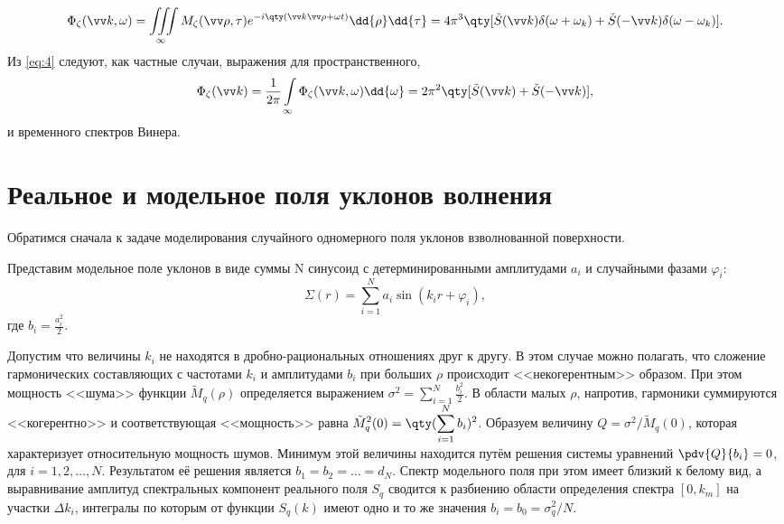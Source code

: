 \begin{gather}
	\label{eq:4}
	\Phi_{\zeta}(\vec k ,\omega)= \iiint\limits_{\infty} 
	M_{\zeta}(\vec \rho, \tau) e^{-i\qty(\vec k \vec \rho + \omega t)} \dd{\rho} \dd{\tau}=4\pi^3 \qty[\tilde S(\vec k) \delta(\omega+\omega_k)+\tilde S(- \vec k) \delta(\omega- \omega_k)].
\end{gather}
Из \eqref{eq:4} следуют, как частные случаи, выражения для пространственного,
\begin{equation}
	\Phi_{\zeta}(\vec k)=\frac{1}{2\pi} \int\limits_{\infty} \Phi_{\zeta}(\vec k, \omega) \dd{\omega}= 2 \pi^2 \qty[\tilde S(\vec k)+\tilde S(-\vec k)],
\end{equation}
и временного спектров Винера.

{\color{red}{Разобрать фундаментально всю  теорию до этого момента.}}
\section{Реальное и модельное поля уклонов волнения}

Обратимся сначала к задаче моделирования случайного одномерного поля уклонов взволнованной поверхности. 

Представим модельное поле уклонов в виде суммы N синусоид с детерминированными амплитудами $a_i$ и случайными фазами $\varphi_i$:
\begin{equation}
	\Sigma(r)=\sum_{i=1}^N a_i \sin(k_ir+\varphi_i), 
\end{equation}
где $b_i=\frac{a_i^2}{2}$.

Допустим что величины $k_i$ не находятся в дробно-рациональных отношениях друг к другу. В этом случае можно полагать, что сложение гармонических составляющих с частотами $k_i$ и амплитудами $b_i$ при больших $\rho$ происходит <<некогерентным>> образом. При этом мощность <<шума>> функции $\tilde M_q(\rho)$ определяется выражением 
$\displaystyle \sigma^2= \sum_{i=1}^N \frac{b_i^2}{2}$. В области малых $\rho$, напротив, гармоники суммируются <<когерентно>> и соответствующая <<мощность>> равна 
$\displaystyle \tilde M^2_q(0)=\qty(\sum_{i=1}^N b_i)^2$. Образуем величину 
$Q=\sigma^2/\tilde M_q(0)$, которая характеризует относительную мощность шумов. Минимум этой величины находится путём решения системы уравнений $\pdv{Q}{b_i}=0$, для $i=1,2,\dots,N.$
Результатом её решения является $b_1=b_2=\dots = d_N$. Спектр модельного поля при этом имеет близкий к белому вид, а выравнивание амплитуд спектральных компонент реального поля $S_q$ сводится к разбиению области определения спектра $[0, k_m]$ на участки $\Delta k_i$, интегралы по которым от функции $S_q(k)$ имеют одно и то же значения $b_i=b_0=\sigma^2_q/N$.

